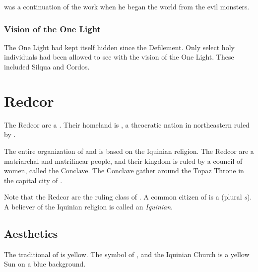 \Tikkun was a continuation of the work  when he began  the world from the evil monsters.





\subsubsection{Vision of the One Light}
The One Light had kept itself hidden since the Defilement. 
Only select holy individuals had been allowed to see with the vision of the One Light.
These included Silqua and Cordos. 
















\section{Redcor}
The Redcor are a \VaimonClan. 
Their homeland is \Redce, a theocratic nation in northeastern \Velcad{} ruled by \ClanRedcor.

The entire organization of \Redce{} and \ClanRedcor is based on the Iquinian religion. 
The Redcor are a matriarchal and matrilinear people, and their kingdom is ruled by a council of women, called the {Conclave}. The Conclave gather around the Topaz Throne in the capital city of \Redce{}. 

\index{\Redcean}
Note that the Redcor are the ruling class of \Redce{}. A common citizen of \Redce{} is a \Redcean{} (plural \emph{\Redcean{}s}). A believer of the Iquinian religion is called an \emph{Iquinian}. 









\subsection{Aesthetics}
The traditional \colour of \ClanRedcor is yellow. 
The symbol of \Redce{}, \ClanRedcor and the Iquinian Church is a yellow Sun on a blue background. 









